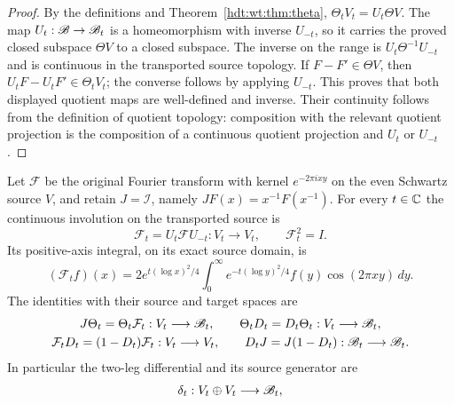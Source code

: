 \begin{proof}
By the definitions and Theorem~\ref{hdt:wt:thm:theta},
$\Theta_tV_t=U_t\Theta V$.  The map $U_t:\mathscr B\to\mathscr B_t$ is a
homeomorphism with inverse $U_{-t}$, so it carries the proved
closed subspace $\Theta V$ to a closed subspace.  The inverse on
the range is $U_t\Theta^{-1}U_{-t}$ and is continuous in the
transported source topology.  If $F-F'\in\Theta V$, then
$U_tF-U_tF'\in\Theta_tV_t$; the converse follows by applying
$U_{-t}$.  This proves that both displayed quotient maps are
well-defined and inverse.  Their continuity follows from the
definition of quotient topology: composition with the relevant
quotient projection is the composition of a continuous quotient
projection and $U_t$ or $U_{-t}$.
\end{proof}

\begin{hdtproposition}
\label{hdt:wt:prop:Fourier-chain}
Let $\mathcal F$ be the original Fourier transform with kernel
$e^{-2\pi ixy}$ on the even Schwartz source $V$, and retain
$J=\mathcal I$, namely $JF(x)=x^{-1}F(x^{-1})$.  For every
$t\in\mathbb C$ the continuous involution on the transported source is
\begin{equation}\label{hdt:wt:eq:Fourier-transport}
 \mathcal F_t=U_t\mathcal F U_{-t}:V_t\longrightarrow V_t,
 \qquad \mathcal F_t^2=I.
\end{equation}
Its positive-axis integral, on its exact source domain, is
\begin{equation}\label{hdt:wt:eq:Fourier-kernel}
 (\mathcal F_tf)(x)=2e^{t(\log x)^2/4}
 \int_0^\infty e^{-t(\log y)^2/4}f(y)\cos(2\pi xy)\,dy.
\end{equation}
The identities with their source and target spaces are
\begin{equation}\label{hdt:wt:eq:Fourier-identities}
 \begin{gathered}
 J\Theta_t=\Theta_t\mathcal F_t:V_t\longrightarrow\mathscr B_t,
 \qquad \Theta_tD_t=D_t\Theta_t:V_t\longrightarrow\mathscr B_t,\\
 \mathcal F_tD_t=(1-D_t)\mathcal F_t:V_t\longrightarrow V_t,
 \qquad D_tJ=J(1-D_t):\mathscr B_t\longrightarrow\mathscr B_t.
 \end{gathered}
\end{equation}
In particular the two-leg differential and its source generator are
\begin{equation}\label{hdt:wt:eq:two-leg}
 \begin{gathered}
 \delta_t:V_t\oplus V_t\longrightarrow\hdtB_t,

\end{gathered}
\end{equation}
\end{hdtproposition}
